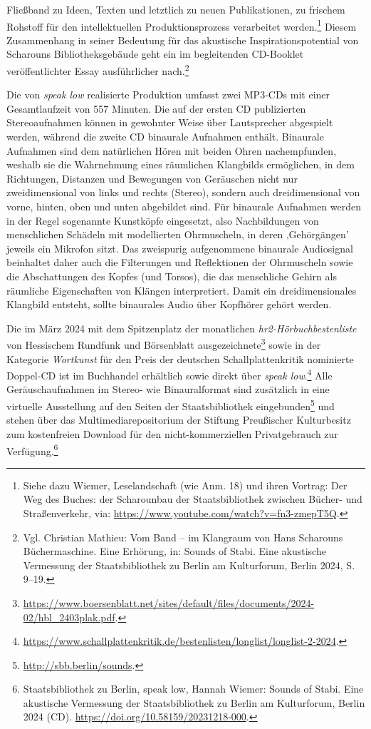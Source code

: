 \documentclass[a4paper,
fontsize=11pt,
oneside,
numbers=noperiodatend,
parskip=half-,
bibliography=totoc,
final
]{scrartcl}
\begin{document}
Fließband zu Ideen, Texten und letztlich zu neuen Publikationen, zu
frischem Rohstoff für den intellektuellen Produktionsprozess verarbeitet
werden.\footnote{Siehe dazu Wiemer, Leselandschaft (wie Anm. 18) und
  ihren Vortrag: Der Weg des Buches: der Scharounbau der
  Staatsbibliothek zwischen Bücher- und Straßenverkehr, via:
  \url{https://www.youtube.com/watch?v=fn3-zmepT5Q}.} Diesem
Zusammenhang in seiner Bedeutung für das akustische
Inspirationspotential von Scharouns Bibliotheksgebäude geht ein im
begleitenden CD-Booklet veröffentlichter Essay ausführlicher
nach.\footnote{Vgl. Christian Mathieu: Vom Band -- im Klangraum von Hans
  Scharouns Büchermaschine. Eine Erhörung, in: Sounds of Stabi. Eine
  akustische Vermessung der Staatsbibliothek zu Berlin am Kulturforum,
  Berlin 2024, S. 9--19.}

Die von \emph{speak low} realisierte Produktion umfasst zwei MP3-CDs mit
einer Gesamtlaufzeit von 557 Minuten. Die auf der ersten CD publizierten
Stereoaufnahmen können in gewohnter Weise über Lautsprecher abgespielt
werden, während die zweite CD binaurale Aufnahmen enthält. Binaurale
Aufnahmen sind dem natürlichen Hören mit beiden Ohren nachempfunden,
weshalb sie die Wahrnehmung eines räumlichen Klangbilds ermöglichen, in
dem Richtungen, Distanzen und Bewegungen von Geräuschen nicht nur
zweidimensional von links und rechts (Stereo), sondern auch
dreidimensional von vorne, hinten, oben und unten abgebildet sind. Für
binaurale Aufnahmen werden in der Regel sogenannte Kunstköpfe
eingesetzt, also Nachbildungen von menschlichen Schädeln mit
modellierten Ohrmuscheln, in deren ‚Gehörgängen' jeweils ein Mikrofon
sitzt. Das zweispurig aufgenommene binaurale Audiosignal beinhaltet
daher auch die Filterungen und Reflektionen der Ohrmuscheln sowie die
Abschattungen des Kopfes (und Torsos), die das menschliche Gehirn als
räumliche Eigenschaften von Klängen interpretiert. Damit ein
dreidimensionales Klangbild entsteht, sollte binaurales Audio über
Kopfhörer gehört werden.

Die im März 2024 mit dem Spitzenplatz der monatlichen
\emph{hr2-Hörbuchbestenliste} von Hessischem Rundfunk und Börsenblatt
ausgezeichnete\footnote{\url{https://www.boersenblatt.net/sites/default/files/documents/2024-02/hbl_2403plak.pdf}.}
sowie in der Kategorie \emph{Wortkunst} für den Preis der deutschen
Schallplattenkritik nominierte Doppel-CD ist im Buchhandel erhältlich
sowie direkt über \emph{speak low}.\footnote{\url{https://www.schallplattenkritik.de/bestenlisten/longlist/longlist-2-2024}.}
Alle Geräuschaufnahmen im Stereo- wie Binauralformat sind zusätzlich in
eine virtuelle Ausstellung auf den Seiten der Staatsbibliothek
eingebunden\footnote{\url{http://sbb.berlin/sounds}.} und stehen über
das Multimediarepositorium der Stiftung Preußischer Kulturbesitz zum
kostenfreien Download für den nicht-kommerziellen Privatgebrauch zur
Verfügung.\footnote{Staatsbibliothek zu Berlin, speak low, Hannah Wiemer: Sounds of Stabi. Eine akustische Vermessung der Staatsbibliothek zu Berlin am Kulturforum, Berlin 2024 (CD). \url{https://doi.org/10.58159/20231218-000}.}
\end{document}
